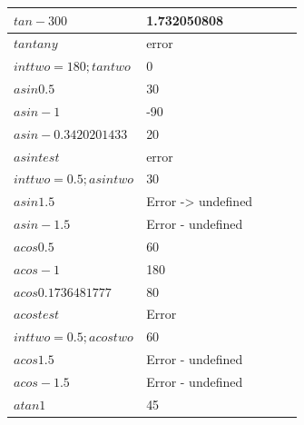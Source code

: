 \documentclass[a4paper, oneside, 11pt]{report}
\begin{document}
\begin{table}[h]
\begin{tabular}{|l|l|l|l|l|}
\hline
$tan -300$                & 1.732050808                     &      &           &                 \\ 
\hline
$tan tany$                & error                           &      &           &                 \\ 
\hline
$int two = 180; tan two$  & 0                               &      &           &                 \\ 
\hline
$asin 0.5$                & 30                              &      &           &                 \\ 
\hline
$asin -1$                 & -90                             &      &           &                 \\ 
\hline
$asin -0.3420201433$      & 20                              &      &           &                 \\ 
\hline
$asin test$               & error                           &      &           &                 \\ 
\hline
$int two = 0.5; asin two$ & 30                              &      &           &                 \\ 
\hline
$asin 1.5$                & Error -\textgreater{} undefined &      &           &                 \\ 
\hline
$asin -1.5$               & Error - undefined               &      &           &                 \\ 
\hline
$acos 0.5$                & 60                              &      &           &                 \\ 
\hline
$acos -1$                 & 180                             &      &           &                 \\ 
\hline
$acos 0.1736481777$       & 80                              &      &           &                 \\ 
\hline
$acos test$               & Error                           &      &           &                 \\ 
\hline
$int two = 0.5; acos two$ & 60                              &      &           &                 \\ 
\hline
$acos 1.5$                & Error - undefined               &      &           &                 \\ 
\hline
$acos -1.5$               & Error - undefined               &      &           &                 \\ 
\hline
$ atan 1$                 & 45                              &      &           &                 \\ 

\end{tabular}
\end{table}
\end{document}
